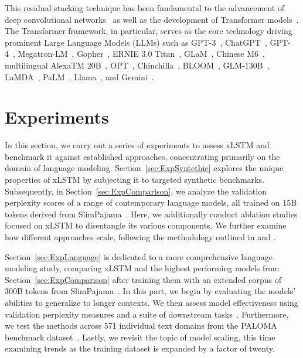 This residual stacking technique has been fundamental to the advancement of deep convolutional networks~\citep{He:16} as well as the development of Transformer models~\citep{Vaswani:17}. The Transformer framework, in particular, serves as the core technology driving prominent Large Language Models (LLMs) such as GPT-3~\citep{Brown:20short}, ChatGPT~\citep{Schulman:22short}, GPT-4~\citep{Achiam:23gpt4short}, Megatron-LM~\citep{Shoeybi:19}, Gopher~\citep{Rae:21short}, ERNIE 3.0 Titan~\citep{Wang:21arxivshort}, GLaM~\citep{Du:21glamshort}, Chinese M6~\citep{Lin:21}, multilingual AlexaTM 20B~\citep{Soltan:22}, OPT~\citep{Zhang:22opt}, Chinchilla~\citep{Hoffmann:22short}, BLOOM~\citep{Scao:22arxivshort}, GLM-130B~\citep{Zeng:22arxivshort}, LaMDA~\citep{Thoppilan:22short}, PaLM~\citep{Chowdhery:22short}, Llama~\citep{Touvron:23arxiv}, and Gemini~\citep{GeminiTeam:23arxiv,Reid:24arxiv}.

\section{Experiments}
\label{sec:Exp}

In this section, we carry out a series of experiments to assess xLSTM and benchmark it against established approaches, concentrating primarily on the domain of language modeling. Section~\ref{sec:ExpSyntethic} explores the unique properties of xLSTM by subjecting it to targeted synthetic benchmarks. 
Subsequently, in Section~\ref{sec:ExpComparison}, we analyze the validation perplexity scores of a range of contemporary language models, all trained on 15B tokens derived from SlimPajama~\citep{Soboleva:23}. Here, we additionally conduct ablation studies focused on xLSTM to disentangle its various components. We further examine how different approaches scale, following the methodology outlined in \citet{Kaplan:20} and \citet{Brown:20short}.

Section~\ref{sec:ExpLanguage} is dedicated to a more comprehensive language modeling study, comparing xLSTM and the highest performing models from Section~\ref{sec:ExpComparison} after training them with an extended corpus of 300B tokens from SlimPajama~\citep{Soboleva:23}. In this part, we begin by evaluating the models’ abilities to generalize to longer contexts. We then assess model effectiveness using validation perplexity measures and a suite of downstream tasks~\citep{Sutawika:24}. Furthermore, we test the methods across 571 individual text domains from the PALOMA benchmark dataset~\citep{Magnusson:23arxivshort}. Lastly, we revisit the topic of model scaling, this time examining trends as the training dataset is expanded by a factor of twenty.

